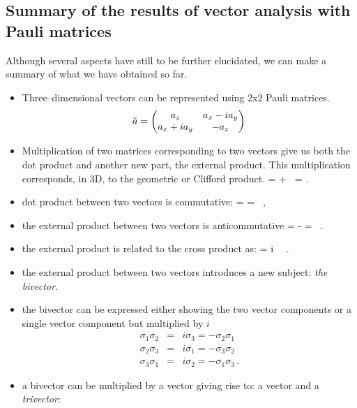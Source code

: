\subsection{Summary of the results of vector analysis with Pauli matrices}
Although several aspects have still to be further elucidated, we can make a summary of what we have obtained so far.
\begin{itemize}
\item Three--dimensional vectors can be represented using 2x2 Pauli matrices.
%
\begin {equation}
\tilde{a} =  \begin{pmatrix}a_z & a_x - i a_y \cr a_x + i a_y & -a_z\end{pmatrix}\,
\label{Epauli}
 \end{equation}
\item Multiplication of two matrices corresponding to two vectors give us both the dot product and another new part, the external product. This multiplication corresponds, in 3D, to the geometric or Clifford product.
%
\be \label{funids}
\Ba  \Bb =  \Ba \cdot \Bb + \Ba \wedge \Bb \, = \ta \tb.
\ee
%
\item dot product between two vectors is commutative: 
%
\be \label{intdef}
\Ba \cdot \Bb = \Bb \cdot \Ba =  \, ,
\ee
%
\item the external product between two vectors is anticommutative
%
\be \label{extdef}
\Ba \wedge \Bb = - \Bb \wedge \Ba = \, .
\ee
%
\item the external product is related to the cross product as:
%
\be \label{epcross3}
\Ba \wedge \Bb =  i \, \Ba \times \Bb \, .
\ee
%
\item the external product between two vectors introduces a new subject:  \emph{the bivector}.
\item the bivector can be expressed either showing the two vector components or a single vector component but multiplied by $i$ 
%
\begin {eqnarray}
\sigma_1 \sigma_2 &=& i \sigma_3  = - \sigma_2 \sigma_1 \nonumber \\
\sigma_2 \sigma_3 &=& i \sigma_1 =  - \sigma_3  \sigma_2\nonumber \\
\sigma_3 \sigma_1 &=&  i \sigma_2 =  - \sigma_1  \sigma_3 \,.
\label{sigmacomb}
 \end{eqnarray}
\item a bivector can be multiplied by a vector giving rise to: a vector and a \emph{trivector}:
\be \label{aB}

\end{itemize}
